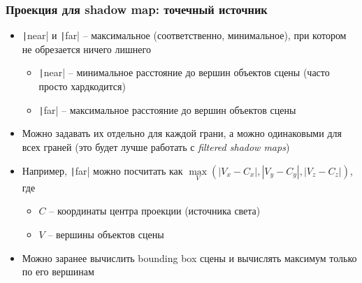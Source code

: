 \documentclass[10pt]{beamer}
\begin{document}
\begin{frame}[fragile]
\frametitle{Проекция для shadow map: точечный источник}
\begin{itemize}
\item \texttt|near| и \texttt|far| -- максимальное (соответственно, минимальное), при котором не обрезается ничего лишнего
\pause
\begin{itemize}
\item \texttt|near| -- минимальное расстояние до вершин объектов сцены (часто просто хардкодится)
\item \texttt|far| -- максимальное расстояние до вершин объектов сцены
\end{itemize}
\pause
\item Можно задавать их отдельно для каждой грани, а можно одинаковыми для всех граней (это будет лучше работать с \textit{filtered shadow maps})
\pause
\item Например, \texttt|far| можно посчитать как \begin{math}\max\limits_V(|V_x-C_x|, |V_y-C_y|, |V_z-C_z|)\end{math}, где
\begin{itemize}
\item \begin{math}C\end{math} -- координаты центра проекции (источника света)
\item \begin{math}V\end{math} -- вершины объектов сцены
\end{itemize}
\pause
\item Можно заранее вычислить bounding box сцены и вычислять максимум только по его вершинам
\end{itemize}
\end{frame}
\end{document}
